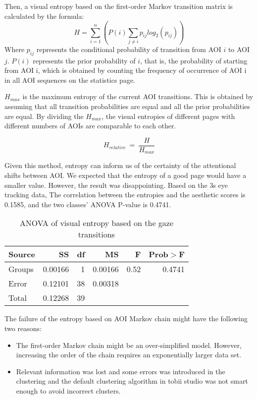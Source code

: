 Then, a visual entropy based on the first-order Markov transition matrix is calculated by the formula:
$$H = \sum_{i=1}^n(P(i)\sum_{j\neq i} p_{ij}log_2(p_{ij}))$$
Where $p_{ij}$ represents the conditional probability of transition from AOI $i$ to AOI $j$. $P(i)$ represents the prior probability of $i$, that is, the probability of starting from AOI i, which is obtained by counting the frequency of occurrence of AOI i in all AOI sequences on the statistics page.

$H_{max}$ is the maximum entropy of the current AOI transitions. This is obtained by assuming that all transition probabilities are equal and all the prior probabilities are equal. By dividing the $H_{max}$, the visual entropies of different pages with different numbers of AOIs are comparable to each other.

$$H_{relative}~=~\frac{H}{H_{max}}$$

Given this method, entropy can inform us of the certainty of the attentional shifts between AOI. We expected that the entropy of a good page would have a smaller value. However, the result was disappointing. Based on the 3s eye tracking data, The correlation between the entropies and the aesthetic scores is 0.1585, and the two classes' ANOVA P-value is 0.4741.

\begin{table}[H]
\begin{tabular}{lrrrrr}
  Source&SS&df&MS&F&Prob$>$F\\ \hline
  Groups&0.00166&1&0.00166&0.52&0.4741\\
  Error&0.12101&38&0.00318&&\\
  Total&0.12268&39&&&\\
\end{tabular}
\caption{ANOVA of visual entropy based on the gaze transitions}
\label{tab:ANOVA-ve}
\end{table}

The failure of the entropy based on AOI Markov chain might have the following two reasons:
\begin{itemize}
  \item The first-order Markov chain might be an over-simplified model. However, increasing the order of the chain requires an exponentially larger data set.
  \item Relevant information was lost and some errors was introduced in the clustering and the default clustering algorithm in tobii studio was not smart enough to avoid incorrect clusters.
\end{itemize}

